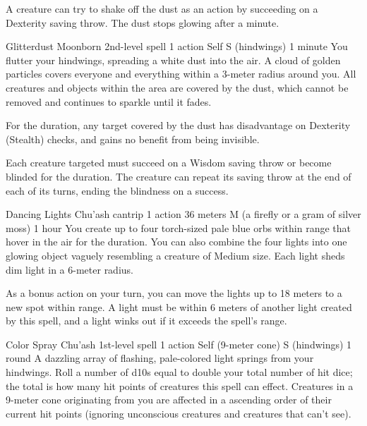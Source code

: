 A creature can try to shake off the dust as an action by succeeding on a Dexterity saving throw.
The dust stops glowing after a minute.

\DndSpellHeader %
    {Glitterdust \label{spell::glitterdust}}
    {Moonborn 2nd-level spell}
    {1 action}
    {Self}
    {S (hindwings)}
    {1 minute}
You flutter your hindwings, spreading a white dust into the air.
A cloud of golden particles covers everyone and everything within a 3-meter radius around you.
All creatures and objects within the area are covered by the dust, which cannot be removed and continues to sparkle until it fades.

For the duration, any target covered by the dust has disadvantage on Dexterity (Stealth) checks, and gains no benefit from being invisible.

Each creature targeted must succeed on a Wisdom saving throw or become blinded for the duration.
The creature can repeat its saving throw at the end of each of its turns, ending the blindness on a success.

\DndSpellHeader %
    {Dancing Lights \label{spell::dancinglights}}
    {Chu'ash cantrip}
    {1 action}
    {36 meters}
    {M (a firefly or a gram of silver moss)}
    {1 hour}
You create up to four torch-sized pale blue orbs within range that hover in the air for the duration.
You can also combine the four lights into one glowing object vaguely resembling a creature of Medium size.
Each light sheds dim light in a 6-meter radius.

As a bonus action on your turn, you can move the lights up to 18 meters to a new spot within range.
A light must be within 6 meters of another light created by this spell, and a light winks out if it exceeds the spell's range.

\DndSpellHeader %
    {Color Spray \label{spell::colorspray}}
    {Chu'ash 1st-level spell}
    {1 action}
    {Self (9-meter cone)}
    {S (hindwings)}
    {1 round}
A dazzling array of flashing, pale-colored light springs from your hindwings.
Roll a number of d10s equal to double your total number of hit dice; the total is how many hit points of creatures this spell can effect.
Creatures in a 9-meter cone originating from you are affected in a ascending order of their current hit points (ignoring unconscious creatures and creatures that can't see).

